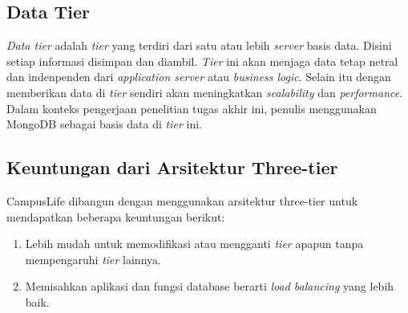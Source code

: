 \documentclass[a4paper, 12pt]{report}
\begin{document}
\subsection{Data Tier}
\onehalfspacing \textit{Data tier} adalah \textit{tier} yang terdiri dari satu atau lebih \textit{server} basis data. Disini setiap informasi disimpan dan diambil. \textit{Tier} ini akan menjaga data tetap netral dan indenpenden dari \textit{application server} atau \textit{business logic}. Selain itu dengan memberikan data di \textit{tier} sendiri akan meningkatkan \textit{scalability} dan \textit{performance}. Dalam konteks pengerjaan penelitian tugas akhir ini, penulis menggunakan MongoDB sebagai basis data di \textit{tier} ini\cite{multitier-architecture-wikipedia}.

\subsection{Keuntungan dari Arsitektur Three-tier}
\onehalfspacing CampusLife dibangun dengan menggunakan arsitektur three-tier untuk mendapatkan beberapa keuntungan berikut:

\begin{enumerate}
  \item Lebih mudah untuk memodifikasi atau mengganti \textit{tier} apapun tanpa mempengaruhi \textit{tier} lainnya.
  \item Memisahkan aplikasi dan fungsi database berarti \textit{load balancing} yang lebih baik.
\end{enumerate}
\end{document}
